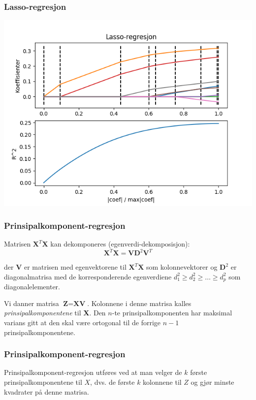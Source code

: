 \documentclass[aspectratio=169]{beamer}
\begin{document}
\begin{frame}
  \frametitle{Lasso-regresjon}
  \begin{center}
    \includegraphics[height=0.8\textheight]{lasso.png}
  \end{center}
\end{frame}

\begin{frame}
  \frametitle{Prinsipalkomponent-regresjon}

  Matrisen \(\textbf{X}^T \textbf{X}\) kan dekomponeres (egenverdi-dekomposisjon):
  \begin{equation}
    \textbf{X}^T\textbf{X} = \textbf{VD}^2\textbf{V}^T
  \end{equation}

  der \(\textbf{V}\) er matrisen med egenvektorene til \(\textbf{X}^T\textbf{X}\) som kolonnevektorer og \(\textbf{D}^2\) er diagonalmatrisa med de korresponderende egenverdiene \(d_1^2 \geq d_2^2 \geq \dots \geq d_p^2\) som diagonalelementer.

  \pause

  Vi danner matrisa \(\textbf{Z} = \textbf{X}\textbf{V}\). Kolonnene i denne matrisa kalles \emph{prinsipalkomponentene} til \textbf{X}. Den \(n\)-te prinsipalkomponenten har maksimal varians gitt at den skal være ortogonal til de forrige \(n-1\) prinsipalkomponentene. 

\end{frame}

\begin{frame}
  \frametitle{Prinsipalkomponent-regresjon}

  Prinsipalkomponent-regresjon utføres ved at man velger de \(k\) første prinsipalkomponentene til \(X\), dvs. de første \(k\) kolonnene til \(Z\) og gjør minste kvadrater på denne matrisa.
\end{frame}
\end{document}

